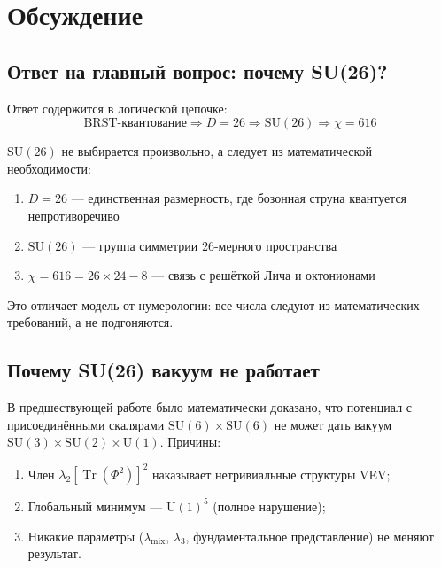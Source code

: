 \documentclass[12pt,a4paper,twoside]{article}
\DeclareMathOperator{\Tr}{Tr}
\newcommand{\SU}{\mathrm{SU}}
\newcommand{\Uone}{\mathrm{U}(1)}
\theoremstyle{definition}
\begin{document}
\section{Обсуждение}
\label{sec:discussion}

\subsection{Ответ на главный вопрос: почему SU(26)?}

Ответ содержится в логической цепочке:
\begin{equation}
\boxed{
\text{BRST-квантование} \Rightarrow D=26 \Rightarrow \SU(26) \Rightarrow \chi=616
}
\end{equation}

$\SU(26)$ не выбирается произвольно, а следует из математической необходимости:
\begin{enumerate}
    \item $D=26$ — единственная размерность, где бозонная струна квантуется непротиворечиво
    \item $\SU(26)$ — группа симметрии 26-мерного пространства
    \item $\chi = 616 = 26 \times 24 - 8$ — связь с решёткой Лича и октонионами
\end{enumerate}

Это отличает модель от нумерологии: все числа следуют из математических требований, а не подгоняются.

\subsection{Почему SU(26) вакуум не работает}

В предшествующей работе \cite{Matershov:2026f} было математически доказано, что потенциал с присоединёнными скалярами $\SU(6) \times \SU(6)$ не может дать вакуум $\SU(3) \times \SU(2) \times \Uone$. Причины:

\begin{enumerate}
    \item Член $\lambda_2[\Tr(\Phi^2)]^2$ наказывает нетривиальные структуры VEV;
    \item Глобальный минимум — $\Uone^5$ (полное нарушение);
    \item Никакие параметры ($\lambda_{\text{mix}}$, $\lambda_3$, фундаментальное представление) не меняют результат.
\end{enumerate}
\end{document}
